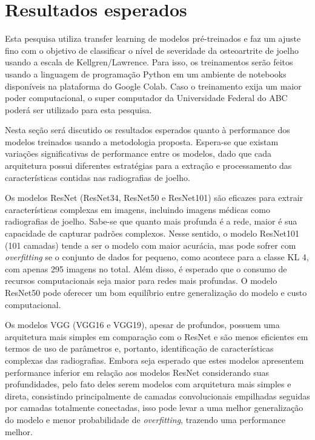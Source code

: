 \chapter{Resultados esperados}\label{cap:resultados}

Esta pesquisa utiliza transfer learning de modelos pré-treinados e faz um ajuste fino com o objetivo de classificar o nível de severidade da osteoartrite de joelho usando a escala de Kellgren/Lawrence. Para isso, os treinamentos serão feitos usando a linguagem de programação Python em um ambiente de notebooks disponíveis na plataforma do Google Colab. Caso o treinamento exija um maior poder computacional, o super computador da Universidade Federal do ABC poderá ser utilizado para esta pesquisa.

Nesta seção será discutido os resultados esperados quanto à performance dos modelos treinados usando a metodologia proposta. Espera-se que existam variações significativas de performance entre os modelos, dado que cada arquitetura possui diferentes estratégias para a extração e processamento das características contidas nas radiografias de joelho.

Os modelos ResNet (ResNet34, ResNet50 e ResNet101) são eficazes para extrair características complexas em imagens, incluindo imagens médicas como radiografias de joelho. Sabe-se que quanto mais profunda é a rede, maior é sua capacidade de capturar padrões complexos. Nesse sentido, o modelo ResNet101 (101 camadas) tende a ser o modelo com maior acurácia, mas pode sofrer com \textit{overfitting} se o conjunto de dados for pequeno, como acontece para a classe KL 4, com apenas 295 imagens no total. Além disso, é esperado que o consumo de recursos computacionais seja maior para redes mais profundas. O modelo ResNet50 pode oferecer um bom equilíbrio entre generalização do modelo e custo computacional.

Os modelos VGG (VGG16 e VGG19), apesar de profundos, possuem uma arquitetura mais simples em comparação com o ResNet e são menos eficientes em termos de uso de parâmetros e, portanto, identificação de características complexas das radiografias. Embora seja esperado que estes modelos apresentem performance inferior em relação aos modelos ResNet considerando suas profundidades, pelo fato deles serem modelos com arquitetura mais simples e direta, consistindo principalmente de camadas convolucionais empilhadas seguidas por camadas totalmente conectadas, isso pode levar a uma melhor generalização do modelo e menor probabilidade de \textit{overfitting}, trazendo uma performance melhor.

